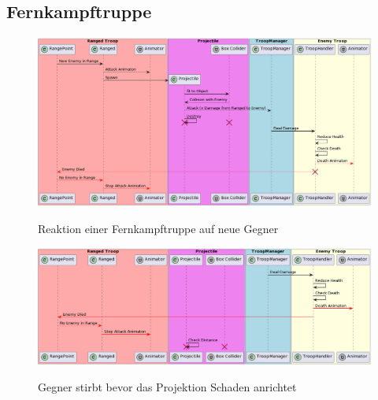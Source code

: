 \subsection{Fernkampftruppe}
\begin{figure}[H]
    \centering
    \includegraphics[width=15cm]{resources/RangedAttacks.png}\\
    \caption{Reaktion einer Fernkampftruppe auf neue Gegner}
\end{figure}
\begin{figure}[H]
    \centering
    \includegraphics[width=15cm]{resources/Projectile.png}\\
    \caption{Gegner stirbt bevor das Projektion Schaden anrichtet}
\end{figure}


